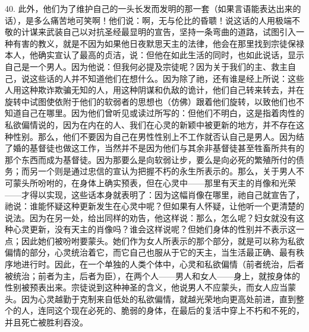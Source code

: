 40. 此外，他们为了维护自己的一头长发而发明的那一套（如果言语能表达出来的话），是多么痛苦地可笑啊！他们说：啊，无与伦比的昏聩！说这话的人用极端不敬的计谋来武装自己以对抗圣经最显明的宣告，坚持一条弯曲的道路，试图引入一种有害的教义，就是不因为如果他日夜默思天主的法律，他会在那里找到宗徒保禄本人，他确实宣认了最高的贞洁，说：但他在如此生活的同时，也如此说话，显示自己是一个男人。因为他说：但我何必提及宗徒呢？因为关于我们的主、救主自己，说这些话的人并不知道他们在想什么。因为除了祂，还有谁是经上所说：这些人用这种欺诈欺骗无知的人，用这种阴谋和仇敌的诡计，他们自己转来转去，并在旋转中试图使依附于他们的软弱者的思想也（仿佛）跟着他们旋转，以致他们也不知道自己在哪里。因为他们曾听见或读过所写的：但他们不明白，这是指着肉性的私欲偏情说的，因为在内在的人、我们在心灵的新颖中被更新的地方，并不存在这种性别。那么，他们不要因为自己在男性性别上不工作就否认自己是男人。因为结了婚的基督徒也做这工作，当然并不是因为他们与其余非基督徒甚至牲畜所共有的那个东西而成为基督徒。因为那要么是向软弱让步，要么是向必死的繁殖所付的债务；而另一个则是通过忠信的宣认为把握不朽的永生所表示的。那么，关于男人不可蒙头所吩咐的，在身体上确实预表，但在心灵中——那里有天主的肖像和光荣——才得以实现，这些话本身就表明了：因为这幅肖像在哪里，祂自己就宣告了，祂说：谁能怀疑这种更新发生在心灵中呢？但如果有人怀疑，让他听一个更清楚的说法。因为在另一处，给出同样的劝告，他这样说：那么，怎么呢？妇女就没有这种心灵更新，没有天主的肖像吗？谁会这样说呢？但她们身体的性别并不表示这一点；因此她们被吩咐要蒙头。她们作为女人所表示的那个部分，就是可以称为私欲偏情的部分，心灵统治着它，而它自己也服从于它的天主，当生活最正确、最有秩序地进行时。因此，在一个单独的人类个体中，心灵和私欲偏情（前者统治，后者被统治；前者为主，后者为臣），在两个人——男人和女人——身上，就按身体的性别被预表出来。宗徒说到这种神圣的含义，他说男人不应蒙头，而女人应当蒙头。因为心灵越勤于克制来自低处的私欲偏情，就越光荣地向更高处前进，直到整个的人，连同这个现在必死的、脆弱的身体，在最后的复活中穿上不朽和不死的，并且死亡被胜利吞没。\par


